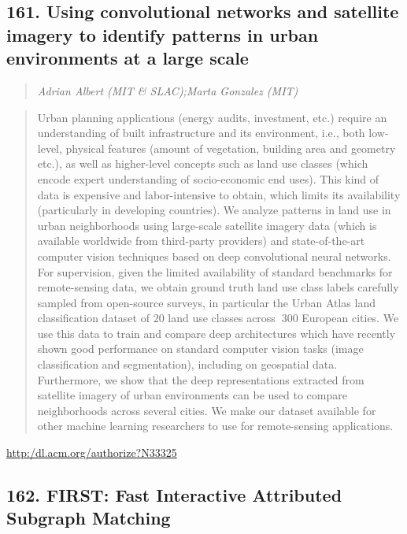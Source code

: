 \documentclass{article}
\begin{document}
\subsection{161. Using convolutional networks and satellite imagery to identify patterns in urban environments at a large scale}

\begin{quote}
\footnotesize{\textit{Adrian Albert (MIT \& SLAC);Marta Gonzalez (MIT)}}

\end{quote}

\begin{quote}
Urban planning applications (energy audits, investment, etc.) require an understanding of built infrastructure and its environment, i.e., both low-level, physical features (amount of vegetation, building area and geometry etc.), as well as higher-level concepts such as land use classes (which encode expert understanding of socio-economic end uses). This kind of data is expensive and labor-intensive to obtain, which limits its availability (particularly in developing countries). We analyze patterns in land use in urban neighborhoods using large-scale satellite imagery data (which is available worldwide from third-party providers) and state-of-the-art computer vision techniques based on deep convolutional neural networks. For supervision, given the limited availability of standard benchmarks for remote-sensing data, we obtain ground truth land use class labels carefully sampled from open-source surveys, in particular the Urban Atlas land classification dataset of $20$ land use classes across $~300$ European cities. We use this data to train and compare deep architectures which have recently shown good performance on standard computer vision tasks (image classification and segmentation), including on geospatial data. Furthermore, we show that the deep representations extracted from satellite imagery of urban environments can be used to compare neighborhoods across several cities. We make our dataset available for other machine learning researchers to use for remote-sensing applications.
\end{quote}

\href{http:/dl.acm.org/authorize?N33325}{http:/dl.acm.org/authorize?N33325}

\subsection{162. FIRST: Fast Interactive Attributed Subgraph Matching}
\end{document}
